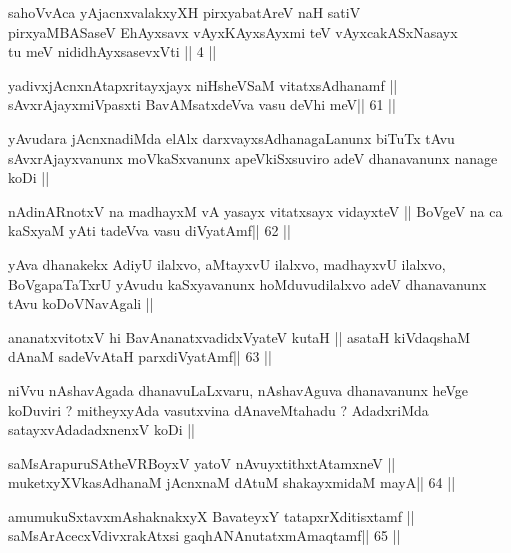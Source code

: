\begin{artha}
sahoVvAca yAjacnxvalakxyXH pirxyabatAreV naH satiV\\
pirxyaMBASaseV EhAyxsavx vAyxKAyxsAyxmi teV vAyxcakASxNasayx\\
tu meV nididhAyxsasevxVti || 4 ||
\end{artha}

\begin{shl}
yadivxjAcnxnAtapxritayxjayx niHsheVSaM vitatxsAdhanamf ||
sAvxrAjayxmiVpasxti BavAMsatxdeVva vasu deVhi meV\hfill || 61 ||
\end{shl}

\begin{artha}
yAvudara jAcnxnadiMda elAlx darxvayxsAdhanagaLanunx biTuTx tAvu
sAvxrAjayxvanunx moVkaSxvanunx apeVkiSxsuviro adeV dhanavanunx nanage
koDi ||
\end{artha}

\begin{shl}
nA\s\s dinARnotxV na madhayxM vA yasayx vitatxsayx vidayxteV ||
BoVgeV na ca kaSxyaM yAti tadeVva vasu diVyatAmf\hfill || 62 ||
\end{shl}

\begin{artha}
yAva dhanakekx AdiyU ilalxvo, aMtayxvU ilalxvo, madhayxvU ilalxvo,
BoVgapaTaTxrU yAvudu kaSxyavanunx hoMduvudilalxvo adeV dhanavanunx
tAvu koDoVNavAgali ||
\end{artha}

\begin{shl}
ananatxvitotxV hi BavAnanatxvadidxVyateV kutaH ||
asataH kiVdaqshaM dAnaM sadeVvAtaH parxdiVyatAmf\hfill || 63 ||
\end{shl}

\begin{artha}
niVvu nAshavAgada dhanavuLaLxvaru, nAshavAguva dhanavanunx heVge
koDuviri ? mitheyxyAda vasutxvina dAnaveMtahadu ? AdadxriMda
satayxvAdadadxnenxV koDi ||
\end{artha}


\begin{shl}
saMsArapuruSAtheVRBoyxV yatoV nAvuyxtithxtAtamxneV ||
muketxyXVkasAdhanaM jAcnxnaM dAtuM shakayxmidaM mayA\hfill || 64 ||
\end{shl}

\begin{shl}
amumukuSxtavxmAshaknakxyX BavateyxY tatapxrXditisxtamf ||
saMsArAcecxVdivxrakAtx\s si gaqhANAnutatxmAmaqtamf\hfill || 65 ||
\end{shl}

